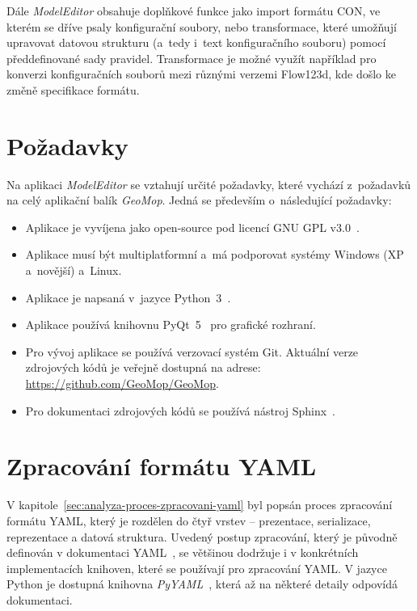 \documentclass[FM,bw,DP]{tulthesis}
\begin{document}
Dále \textit{ModelEditor} obsahuje doplňkové funkce jako import formátu CON, ve kterém se dříve psaly konfigurační soubory, nebo transformace, které umožňují upravovat datovou strukturu (a~tedy i~text konfiguračního souboru) pomocí předdefinované sady pravidel. Transformace je možné využít například pro konverzi konfiguračních souborů mezi různými verzemi Flow123d, kde došlo ke změně specifikace formátu.


\section{Požadavky}

Na aplikaci \textit{ModelEditor} se vztahují určité požadavky, které vychází z~požadavků na celý aplikační balík \textit{GeoMop}. Jedná se především o~následující požadavky:

\begin{itemize}
\item Aplikace je vyvíjena jako open-source pod licencí \acrshort{GNU} \gls{GPL} v3.0~\cite{bib:gnu-gpl3}.
\item Aplikace musí být multiplatformní a~má podporovat systémy Windows (XP a~novější) a~Linux.
\item Aplikace je napsaná v~jazyce Python~3~\cite{bib:python3}.
\item Aplikace používá knihovnu PyQt~5~\cite{bib:pyqt5} pro grafické rozhraní.
\item Pro vývoj aplikace se používá verzovací systém Git. Aktuální verze zdrojových kódů je veřejně dostupná na adrese: \url{https://github.com/GeoMop/GeoMop}.
\item Pro dokumentaci zdrojových kódů se používá nástroj Sphinx~\cite{bib:sphinx}.
\end{itemize}


\section{Zpracování formátu YAML}
\label{sec:implementace-yaml}

V kapitole~\ref{sec:analyza-proces-zpracovani-yaml} byl popsán proces zpracování formátu \gls{YAML}, který je rozdělen do čtyř vrstev -- prezentace, serializace, reprezentace a datová struktura. Uvedený postup zpracování, který je původně definován v dokumentaci \gls{YAML}~\cite{bib:yaml}, se většinou dodržuje i v konkrétních implementacích knihoven, které se používají pro zpracování \gls{YAML}. V jazyce Python je dostupná knihovna \textit{PyYAML}~\cite{bib:pyyaml}, která až na některé detaily odpovídá dokumentaci.
\end{document}
